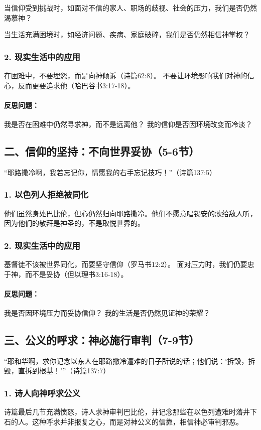 \documentclass[a4paper, 12pt]{article}
\begin{document}
当信仰受到挑战时，如面对不信的家人、职场的歧视、社会的压力，我们是否仍然渴慕神？

当生活充满困境时，如经济问题、疾病、家庭破碎，我们是否仍然相信神掌权？

\subsubsection*{2. 现实生活中的应用}
在困难中，不要埋怨，而是向神倾诉（诗篇62:8）。
不要让环境影响我们对神的信心，反而更要追求他（哈巴谷书3:17-18）。
\paragraph*{反思问题：}

我是否在困难中仍然寻求神，而不是远离他？
我的信仰是否因环境改变而冷淡？
\subsection*{二、信仰的坚持：不向世界妥协（5-6节）}
“耶路撒冷啊，我若忘记你，情愿我的右手忘记技巧！”（诗篇137:5）

\subsubsection*{1. 以色列人拒绝被同化}
他们虽然身处巴比伦，但心仍然归向耶路撒冷。他们不愿意唱锡安的歌给敌人听，因为他们的敬拜是神圣的，不是取悦世界的。

\subsubsection*{2. 现实生活中的应用}
基督徒不该被世界同化，而要坚守信仰（罗马书12:2）。
面对压力时，我们仍要忠于神，而不是妥协（但以理书3:16-18）。
\paragraph*{反思问题：}

我是否因环境压力而妥协信仰？
我的生活是否仍然见证神的荣耀？
\subsection*{三、公义的呼求：神必施行审判（7-9节）}
“耶和华啊，求你记念以东人在耶路撒冷遭难的日子所说的话；他们说：‘拆毁，拆毁，直拆到根基！’”（诗篇137:7）

\subsubsection*{1. 诗人向神呼求公义}
诗篇最后几节充满愤怒，诗人求神审判巴比伦，并记念那些在以色列遭难时落井下石的人。这种呼求并非报复之心，而是对神公义的信靠，相信神必审判邪恶。
\end{document}

